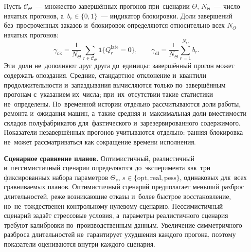 Пусть $\mathcal C_\Theta$~--- множество завершённых прогонов при~сценарии $\Theta$, $N_\Theta$~--- число начатых прогонов, а~$b_r\in\{0,1\}$~--- индикатор блокировки. Доли завершений без~просроченных заказов и~блокировок определяются относительно всех $N_{\Theta}$ начатых прогонов:
\[
\gamma_{\mathrm{ok}}=\frac{1}{N_{\Theta}}\sum_{r\in\mathcal C_\Theta}\mathbf{1}\{Q^{\mathrm{late}}_r=0\},\qquad
\gamma_{\mathrm{dl}}=\frac{1}{N_{\Theta}}\sum_{r=1}^{N_{\Theta}}b_r.
\]
Эти~доли не~дополняют друг друга до~единицы: завершённый прогон может содержать опоздания. Средние, стандартное отклонение и~квантили продолжительности и~запаздывания вычисляются только по~завершённым прогонам с~указанием их~числа; при~их~отсутствии такие статистики не~определены. По~временной истории отдельно рассчитываются доли работы, ремонта и~ожидания машин, а~также средняя и~максимальная доли вместимости складов полуфабрикатов для~фактического и~зарезервированного содержимого. Показатели незавершённых прогонов учитываются отдельно: ранняя блокировка не~может рассматриваться как сокращение времени исполнения.

\textbf{Сценарное сравнение планов.} Оптимистичный, реалистичный и~пессимистичный сценарии определяются до~эксперимента как~три фиксированных набора параметров $\Theta_s$, $s\in\{\mathrm{opt},\mathrm{real},\mathrm{pess}\}$, одинаковых для~всех сравниваемых планов. Оптимистичный сценарий предполагает меньший разброс длительностей, реже возникающие отказы и~более быстрое восстановление, но~не~тождественен контрольному нулевому сценарию. Пессимистичный сценарий задаёт стрессовые условия, а~параметры реалистичного сценария требуют калибровки по~производственным данным. Увеличение симметричного разброса длительностей не~гарантирует ухудшения каждого прогона, поэтому показатели оцениваются внутри каждого сценария.

